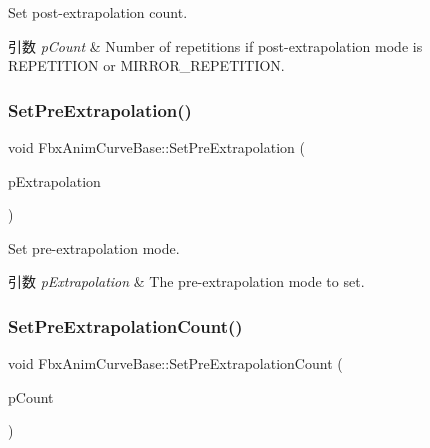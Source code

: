 Set post-\/extrapolation count. 
\begin{DoxyParams}{引数}
{\em p\+Count} & Number of repetitions if post-\/extrapolation mode is R\+E\+P\+E\+T\+I\+T\+I\+ON or M\+I\+R\+R\+O\+R\+\_\+\+R\+E\+P\+E\+T\+I\+T\+I\+ON. \\
\hline
\end{DoxyParams}
\mbox{\label{class_fbx_anim_curve_base_abf3ba6c80fe9371be31602eb36789989}} 
\subsubsection{\texorpdfstring{Set\+Pre\+Extrapolation()}{SetPreExtrapolation()}}
{\footnotesize\ttfamily void Fbx\+Anim\+Curve\+Base\+::\+Set\+Pre\+Extrapolation (\begin{DoxyParamCaption}\item[{\hyperlink{class_fbx_anim_curve_base_aa7214d43daa7b6b9b47a8118a858847f}{E\+Extrapolation\+Type}}]{p\+Extrapolation }\end{DoxyParamCaption})}

Set pre-\/extrapolation mode. 
\begin{DoxyParams}{引数}
{\em p\+Extrapolation} & The pre-\/extrapolation mode to set. \\
\hline
\end{DoxyParams}
\mbox{\label{class_fbx_anim_curve_base_a9103e7ae34ef31d2952df0684cda6754}} 
\subsubsection{\texorpdfstring{Set\+Pre\+Extrapolation\+Count()}{SetPreExtrapolationCount()}}
{\footnotesize\ttfamily void Fbx\+Anim\+Curve\+Base\+::\+Set\+Pre\+Extrapolation\+Count (\begin{DoxyParamCaption}\item[{unsigned long}]{p\+Count }\end{DoxyParamCaption})}

